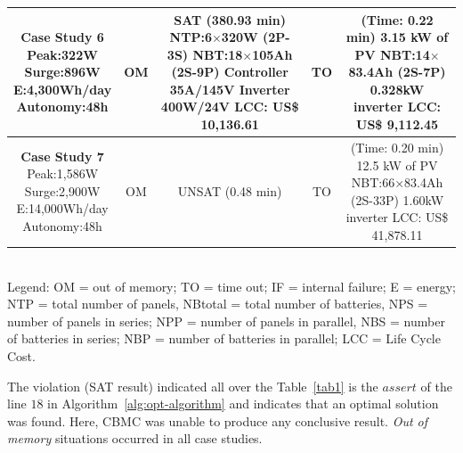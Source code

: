 \documentclass[runningheads]{llncs}
\begin{document}
\begin{table}
\begin{scriptsize}
\begin{tabular}{c|c|c|c|c}
\hline
\makecell{\textbf{Case Study 6}\\Peak:322W\\Surge:896W\\E:4,300Wh/day\\Autonomy:48h} & OM & \makecell {SAT (380.93 min) \\NTP:6$\times$320W (2P-3S)\\NBT:18$\times$105Ah (2S-9P)\\Controller 35A/145V\\Inverter 400W/24V \\LCC: US\$ 10,136.61} & TO & \makecell{(Time: 0.22 min)\\3.15 kW of PV\\NBT:14$\times$83.4Ah (2S-7P)\\0.328kW inverter\\LCC: US\$ 9,112.45} \\
\hline
\makecell{\textbf{Case Study 7}\\Peak:1,586W\\Surge:2,900W\\E:14,000Wh/day\\Autonomy:48h} & OM & UNSAT (0.48 min) & TO & \makecell{(Time: 0.20 min)\\12.5 kW of PV\\NBT:66$\times$83.4Ah (2S-33P)\\1.60kW inverter\\LCC: US\$ 41,878.11} \\
\hline
\hline
\end{tabular}
\\Legend: OM = out of memory; TO = time out; IF = internal failure; E = energy;    NTP = total number of panels, NBtotal = total number of batteries, NPS = number of panels in series; NPP = number of panels in parallel, NBS = number of batteries in series; NBP = number of batteries in parallel; LCC = Life Cycle Cost.
\end{scriptsize}
\end{table}
%
The violation (SAT result) indicated all over the Table~\ref{tab1} 
is the $assert$ of the line $18$ in Algorithm~\ref{alg:opt-algorithm} and indicates that an optimal solution was found.
Here, CBMC was unable to produce any conclusive result. \textit{Out of memory} situations occurred in all case studies.
\end{document}
